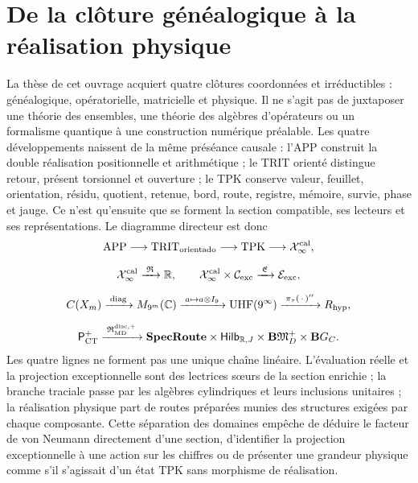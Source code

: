 \section*{De la clôture généalogique à la réalisation physique}

La thèse de cet ouvrage acquiert quatre clôtures coordonnées et irréductibles :
généalogique, opératorielle, matricielle et physique. Il ne s'agit pas de juxtaposer une
théorie des ensembles, une théorie des algèbres d'opérateurs ou un formalisme
quantique à une construction numérique préalable. Les quatre développements naissent de
la même préséance causale : l'APP construit la double réalisation positionnelle et
arithmétique ; le TRIT orienté distingue retour, présent torsionnel et ouverture ;
le TPK conserve valeur, feuillet, orientation, résidu, quotient, retenue, bord,
route, registre, mémoire, survie, phase et jauge. Ce n'est qu'ensuite que se forment
la section compatible, ses lecteurs et ses représentations. Le diagramme directeur
est donc
\[
\begin{gathered}
 \mathrm{APP}
 \longrightarrow \mathrm{TRIT}_{\rm orientado}
 \longrightarrow \mathrm{TPK}
 \longrightarrow \mathcal X_\infty^{\rm cal},\\[2mm]
 \mathcal X_\infty^{\rm cal}
 \xrightarrow{\;\mathfrak R\;}\mathbb R,
 \qquad
 \mathcal X_\infty^{\rm cal}\times\mathcal C_{\rm exc}
 \xrightarrow{\;\mathfrak E\;}\mathcal E_{\rm exc},\\[2mm]
 C(X_m)\xrightarrow{\;\operatorname{diag}\;}M_{9^m}(\mathbb C)
 \xrightarrow{\;a\mapsto a\otimes I_9\;}
 \mathrm{UHF}(9^\infty)
 \xrightarrow{\;\pi_\tau(\,\cdot\,)''\;}R_{\rm hyp},\\[2mm]
 \mathsf P_{\rm CT}^{+}
 \xrightarrow{\;\mathfrak R_{\rm MD}^{\rm disc,+}\;}
 \mathbf{SpecRoute}\times\mathsf{Hilb}_{\mathbb R,J}
 \times\mathbf B\mathfrak M_D^+\times\mathbf B G_C.
\end{gathered}
\]
Les quatre lignes ne forment pas une unique chaîne linéaire. L'évaluation réelle et la
projection exceptionnelle sont des lectrices sœurs de la section enrichie ; la
branche traciale passe par les algèbres cylindriques et leurs inclusions unitaires ; la
réalisation physique part de routes préparées munies des structures
exigées par chaque composante. Cette séparation des domaines empêche de déduire le facteur de
von Neumann directement d'une section, d'identifier la projection
exceptionnelle à une action sur les chiffres ou de présenter une grandeur physique comme
s'il s'agissait d'un état TPK sans morphisme de réalisation.

